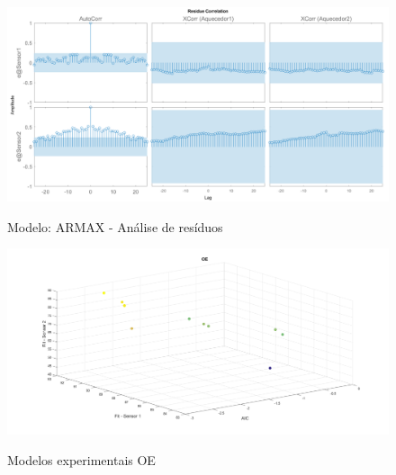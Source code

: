 \begin{apendicesenv}
\begin{figure}
	\caption{Modelo: ARMAX - Análise de resíduos}
	\begin{center}
		\includegraphics[width=1.00\textwidth]{./5_images/tclabsp-models-ARMAX-resid.png} 
		\label{fig:tclabsp-models-armax-resid}
	\end{center}
	\centering
\end{figure}

\begin{figure}[h]
	\caption{Modelos experimentais OE}
	\begin{center}
		\includegraphics[width=1.00\textwidth]{./5_images/tclabsp-models-OE.png} 
		\label{fig:tclabsp-models-oe}
	\end{center}
	\centering
\end{figure}


\end{apendicesenv}
